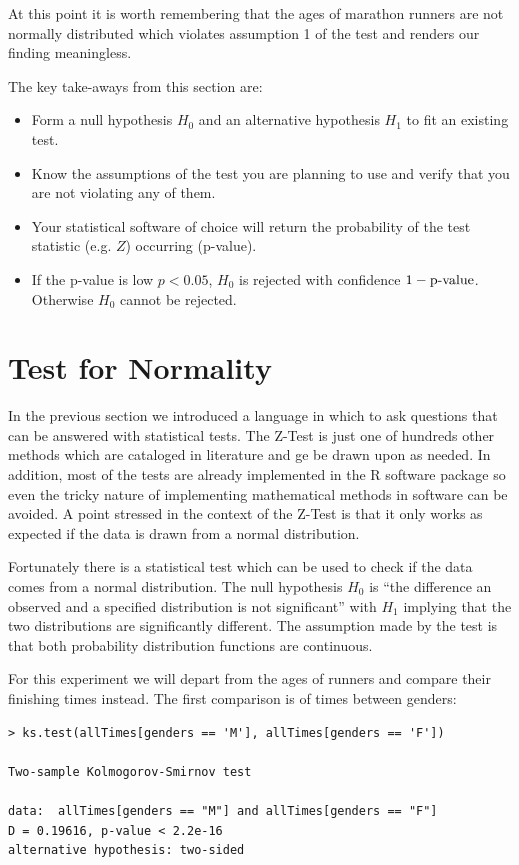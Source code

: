 \documentclass{tufte-book} %
\begin{document}
At this point it is worth remembering that the ages of marathon runners are not normally distributed which violates assumption 1 of the test and renders our finding meaningless.

\begin{tcolorbox}
	The key take-aways from this section are:
	\begin{itemize}
		\item Form a null hypothesis $H_0$ and an alternative hypothesis $H_1$ to fit an existing test.
		\item Know the assumptions of the test you are planning to use and verify that you are not violating any of them.
		\item Your statistical software of choice will return the probability of the test statistic (e.g. $Z$) occurring (p-value).
		\item If the p-value is low $p<0.05$, $H_0$ is rejected with confidence $1 - \hbox{p-value}$. Otherwise $H_0$ cannot be rejected.
	\end{itemize}
\end{tcolorbox}

\section{Test for Normality}
In the previous section we introduced a language in which to ask questions that can be answered with statistical tests. The \hbox{Z-Test} is just one of hundreds other methods which are cataloged in literature\cite{kanji2006} and ge be drawn upon as needed. In addition, most of the tests are already implemented in the R software package so even the tricky nature of implementing mathematical methods in software can be avoided. A point stressed in the context of the \hbox{Z-Test} is that it only works as expected if the data is drawn from a normal distribution. 

Fortunately there is a statistical test which can be used to check if the data comes from a normal distribution. The null hypothesis $H_0$ is ``the difference an observed and a specified distribution is not significant'' with $H_1$ implying that the two distributions are significantly different. The assumption made by the test is that both probability distribution functions are continuous.

For this experiment we will depart from the ages of runners and compare their finishing times instead. The first comparison is of times between genders:

\begin{Verbatim}
> ks.test(allTimes[genders == 'M'], allTimes[genders == 'F'])

Two-sample Kolmogorov-Smirnov test

data:  allTimes[genders == "M"] and allTimes[genders == "F"]
D = 0.19616, p-value < 2.2e-16
alternative hypothesis: two-sided
\end{Verbatim}
\end{document}

